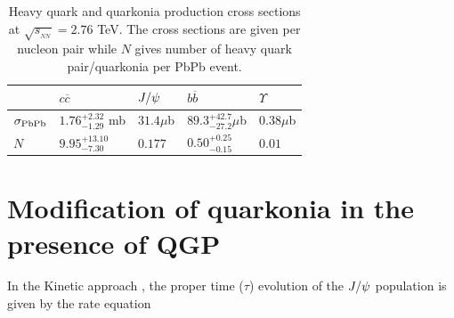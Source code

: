 \documentclass[aps,prc,preprint,superscriptaddress,showpacs,showkeys]{revtex4-1}
\begin{document}
\begin{table}
\caption[]{Heavy quark and quarkonia production  cross sections at
$\sqrt{s_{_{NN}}}= 2.76$ TeV. The cross sections are given per nucleon pair while
$N$ gives number of heavy quark pair/quarkonia per PbPb event.}
\label{NLOcros}
\begin{tabular}{l|l|l|l|l} 
\hline 
\hline
                     & $ c \overline c$           &$J/\psi$      & $ b \overline b$           & $\Upsilon$   \\              
\hline
$\sigma_{\rm PbPb}$  & $1.76^{+2.32}_{-1.29}$ mb  & $31.4 \mu$b  & $89.3^{+42.7}_{-27.2} \mu$b  & $0.38 \mu$b  \\
$N$                  &$9.95^{+13.10}_{-7.30}$     & $0.177$      & $0.50^{+0.25}_{-0.15}$     & $0.01$       \\
\hline
\hline
\end{tabular}
\end{table}





\section{Modification of quarkonia in the presence of QGP}
 In the Kinetic approach \cite{Thews:2000rj}, the proper time ($\tau$) evolution of the $J/\psi$ population 
is given by the rate equation 
\end{document}
